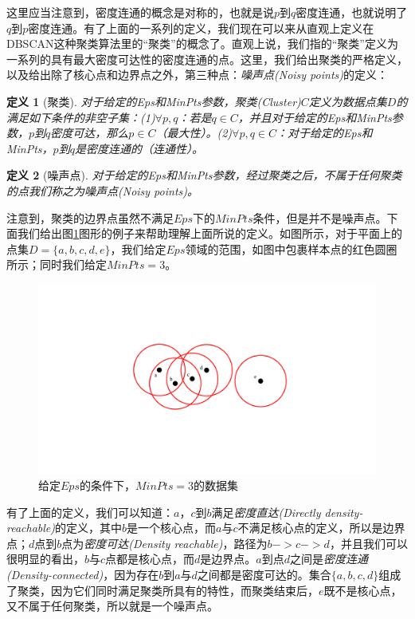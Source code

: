 \documentclass[UTF8, 12pt]{ctexart}
\newtheorem{thm}{定义}
\begin{document}
这里应当注意到，密度连通的概念是对称的，也就是说$p$到$q$密度连通，也就说明了$q$到$p$密度连通。有了上面的一系列的定义，我们现在可以来从直观上定义在DBSCAN这种聚类算法里的“聚类”的概念了。直观上说，我们指的“聚类”定义为一系列的具有最大密度可达性的密度连通的点。这里，我们给出聚类的严格定义，以及给出除了核心点和边界点之外，第三种点：\emph{噪声点(Noisy points)}的定义：
\begin{thm}[聚类]
	对于给定的Eps和MinPts参数，聚类(Cluster)$C$定义为数据点集$D$的满足如下条件的非空子集：(1)$\forall p,q$：若是$q \in C$，并且对于给定的Eps和MinPts参数，$p$到$q$密度可达，那么$p \in C$（最大性）。(2)$\forall p,q \in C$：对于给定的Eps和MinPts，$p$到$q$是密度连通的（连通性）。
\end{thm}
\begin{thm}[噪声点]
	对于给定的Eps和MinPts参数，经过聚类之后，不属于任何聚类的点我们称之为噪声点(Noisy points)。
\end{thm}

注意到，聚类的边界点虽然不满足$Eps$下的$MinPts$条件，但是并不是噪声点。下面我们给出图\ref{Fig:2}图形的例子来帮助理解上面所说的定义。如图所示，对于平面上的点集$D=\{a, b, c, d, e\}$，我们给定$Eps$领域的范围，如图中包裹样本点的红色圆圈所示；同时我们给定$MinPts=3$。
\begin{figure}[H]
	\centering
	\includegraphics[width=0.5\linewidth]{..//Plots//corePoints.pdf}
	\caption{给定$Eps$的条件下，$MinPts=3$的数据集}
	\label{Fig:2}
	\vspace{-0.5em}
\end{figure}

有了上面的定义，我们可以知道：$a$，$c$到$b$满足\emph{密度直达(Directly density-reachable)}的定义，其中$b$是一个核心点，而$a$与$c$不满足核心点的定义，所以是边界点；$d$点到$b$点为\emph{密度可达(Density reachable)}，路径为$b -> c -> d$，并且我们可以很明显的看出，$b$与$c$点都是核心点，而$d$是边界点。$a$到点$d$之间是\emph{密度连通(Density-connected)}，因为存在$b$到$a$与$d$之间都是密度可达的。集合$\{a, b, c, d\}$组成了聚类，因为它们同时满足聚类所具有的特性，而聚类结束后，$e$既不是核心点，又不属于任何聚类，所以就是一个噪声点。
\end{document}
